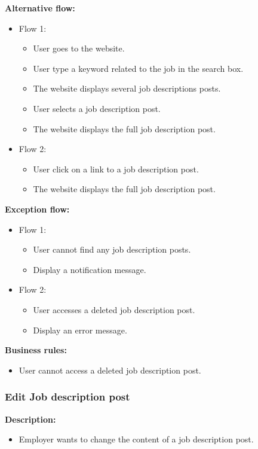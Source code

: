 \documentclass[a4paper]{article}
\begin{document}
\textbf{Alternative flow:}
\begin{itemize}
  \item Flow 1:
    \begin{itemize}
      \item User goes to the website.
      \item User type a keyword related to the job in the search box.
      \item The website displays several job descriptions posts.
      \item User selects a job description post.
      \item The website displays the full job description post.
    \end{itemize}
  \item Flow 2:
    \begin{itemize}
      \item User click on a link to a job description post.
      \item The website displays the full job description post.
    \end{itemize}
\end{itemize}

\textbf{Exception flow:}
\begin{itemize}
  \item Flow 1:
    \begin{itemize}
      \item User cannot find any job description posts.
      \item Display a notification message.
    \end{itemize}
  \item Flow 2:
    \begin{itemize}
      \item User accesses a deleted job description post.
      \item Display an error message.
    \end{itemize}
\end{itemize}

\textbf{Business rules:}
\begin{itemize}
  \item User cannot access a deleted job description post.
\end{itemize}

\subsubsection{Edit Job description post}
\textbf{Description:}
\begin{itemize}
  \item Employer wants to change the content of a job description post.
\end{itemize}
\end{document}
